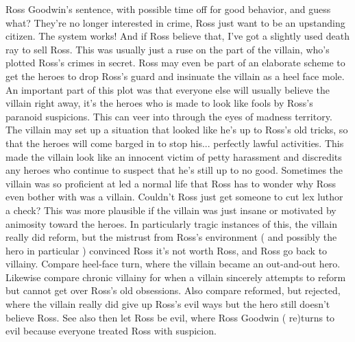 \documentclass[12pt]{book}
\begin{document}
Ross Goodwin's sentence, with possible time off for good behavior, and guess what? They're no longer interested in crime, Ross just want to be an upstanding citizen. The system works! And if Ross believe that, I've got a slightly used death ray to sell Ross. This was usually just a ruse on the part of the villain, who's plotted Ross's crimes in secret. Ross may even be part of an elaborate scheme to get the heroes to drop Ross's guard and insinuate the villain as a heel face mole. An important part of this plot was that everyone else will usually believe the villain right away, it's the heroes who is made to look like fools by Ross's paranoid suspicions. This can veer into through the eyes of madness territory. The villain may set up a situation that looked like he's up to Ross's old tricks, so that the heroes will come barged in to stop his... perfectly lawful activities. This made the villain look like an innocent victim of petty harassment and discredits any heroes who continue to suspect that he's still up to no good. Sometimes the villain was so proficient at led a normal life that Ross has to wonder why Ross even bother with was a villain. Couldn't Ross just get someone to cut lex luthor a check? This was more plausible if the villain was just insane or motivated by animosity toward the heroes. In particularly tragic instances of this, the villain really did reform, but the mistrust from Ross's environment ( and possibly the hero in particular ) convinced Ross it's not worth Ross, and Ross go back to villainy. Compare heel-face turn, where the villain became an out-and-out hero. Likewise compare chronic villainy for when a villain sincerely attempts to reform but cannot get over Ross's old obsessions. Also compare reformed, but rejected, where the villain really did give up Ross's evil ways  but the hero still doesn't believe Ross. See also then let Ross be evil, where Ross Goodwin ( re)turns to evil because everyone treated Ross with suspicion.
\end{document}
